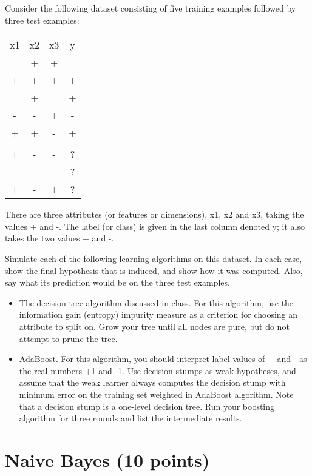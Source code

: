\documentclass{article}
\begin{document}
Consider the following dataset consisting of five training examples followed by three test examples:
\begin{center}
\begin{tabular}{ c c c c }
x1 & x2 & x3 & y\\
- & + & + & -\\
+ & + & + & +\\
- & + & - & +\\
- & - & + & -\\
+ & + & - & +\\
\hline \\
+ & - & - & ?\\
- & - & - & ?\\
+ & - & + & ?\\
\end{tabular}
\end{center}



There are three attributes (or features or dimensions), x1, x2 and x3, taking the values +  and -. The label (or class) is given in the last column denoted y; it also takes the two values + and -. 

Simulate each of the following learning algorithms on this dataset. In each case, show the final hypothesis that is induced, and show how it was computed. Also, say what its prediction would be on the three test examples.

\begin{itemize}
\item  The decision tree algorithm discussed in class. For this algorithm, use the information gain (entropy) impurity measure as a criterion for choosing an attribute to split on. Grow your tree until all nodes are pure, but do not attempt to prune the tree.

\item AdaBoost. For this algorithm, you should interpret label values of + and - as the real numbers +1 and -1. Use decision stumps as weak hypotheses, and assume that the weak learner always computes the decision stump with minimum error on the training set weighted in AdaBoost algorithm. Note that a decision stump is a one-level decision tree. Run your boosting algorithm for three rounds and list the intermediate results.
\end{itemize}


\section{Naive Bayes (10 points)}
\end{document}
